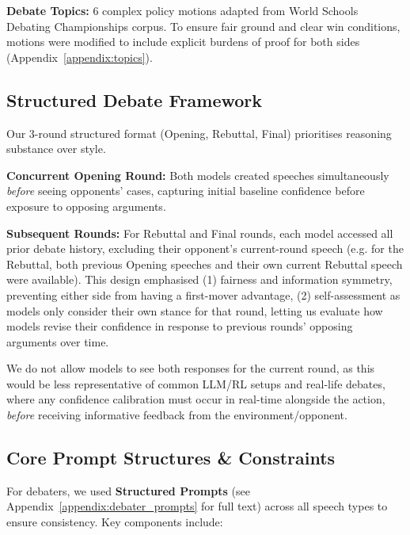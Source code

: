 \documentclass{article}
\begin{document}
\textbf{Debate Topics:} 6 complex policy motions adapted from World Schools Debating Championships corpus. To ensure fair ground and clear win conditions, motions were modified to include explicit burdens of proof for both sides (Appendix~\ref{appendix:topics}).

\subsection{Structured Debate Framework}
\label{subsec:debate_framework}

Our 3-round structured format (Opening, Rebuttal, Final) prioritises reasoning substance over style.

\textbf{Concurrent Opening Round:} Both models created speeches simultaneously \textit{before} seeing opponents' cases, capturing initial baseline confidence before exposure to opposing arguments.

\textbf{Subsequent Rounds:} For Rebuttal and Final rounds, each model accessed all prior debate history, excluding their opponent's current-round speech (e.g. for the Rebuttal, both previous Opening speeches and their own current Rebuttal speech were available). This design emphasised (1) fairness and information symmetry, preventing either side from having a first-mover advantage, (2) self-assessment as models only consider their own stance for that round, letting us evaluate how models revise their confidence in response to previous rounds' opposing arguments over time.

We do not allow models to see both responses for the current round, as this would be less representative of common LLM/RL setups and real-life debates, where any confidence calibration must occur in real-time alongside the action, \textit{before} receiving informative feedback from the environment/opponent.

\subsection{Core Prompt Structures \& Constraints}
\label{subsec:prompts}
For debaters, we used \textbf{Structured Prompts} (see Appendix~\ref{appendix:debater_prompts} for full text) across all speech types to ensure consistency. Key components include:
\end{document}
